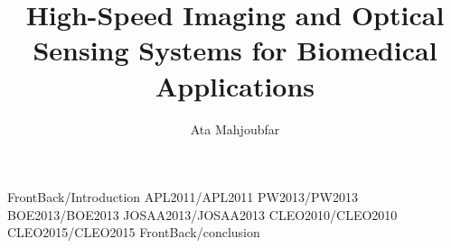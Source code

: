 \documentclass [PhD] {uclathes}
\title          {High-Speed Imaging and Optical Sensing Systems for Biomedical Applications}
\author         {Ata Mahjoubfar}
\begin{document}
\makeintropages

%
%
 {FrontBack/Introduction}                         %
 {APL2011/APL2011}                         %
 {PW2013/PW2013}                         %
 {BOE2013/BOE2013}
 {JOSAA2013/JOSAA2013}
 {CLEO2010/CLEO2010}
 {CLEO2015/CLEO2015}
 {FrontBack/conclusion}




\end{document}
